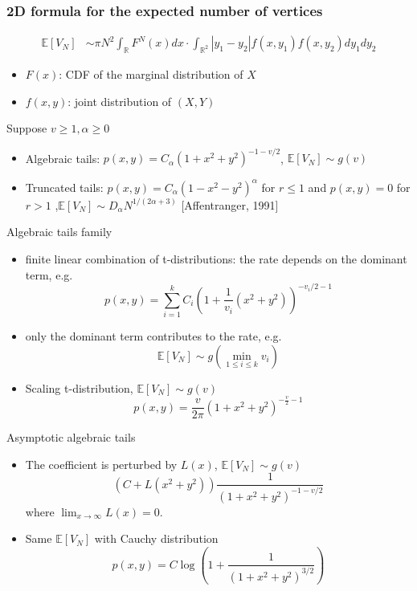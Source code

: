 \documentclass{beamer}
\def\E{\mathbb{E}}
\def\R{\mathbb{R}}
\begin{document}
\begin{frame}
    \frametitle{
        2D formula for the expected number of vertices
    }
    \begin{align*}
        \E[V_N]
        & \sim \pi N^2 \int_{\R} F^{N}(x) dx \cdot \int_{\R^2} |y_1-y_2| f(x, y_1) f(x,y_2)dy_1dy_2
    \end{align*}
    \begin{itemize}
        \item $F(x)$: CDF of the marginal distribution of $X$
        \item $f(x,y)$: joint distribution of $(X,Y)$
    \end{itemize}
    Suppose  $v\geq 1, \alpha \geq 0$
    \begin{itemize}
        \item Algebraic tails: $p(x,y) = C_{\alpha}(1+x^2+y^2)^{-1-v/2}$,
        $\E[V_N] \sim g(v)$
        \item Truncated tails: $p(x,y) = C_{\alpha}(1-x^2-y^2)^{\alpha}$ for $r\leq 1$ and $p(x,y)=0$ for $r>1$
        ,$\E[V_N] \sim D_{\alpha} N^{1/(2\alpha + 3)}$ [Affentranger, 1991]
    \end{itemize}

\end{frame}
\begin{frame}{Algebraic tails family}
    \begin{itemize}
        \item finite linear combination of t-distributions: the rate depends on the dominant term, e.g.
        \begin{equation*}
            p(x,y) = \sum_{i=1}^k C_i (1+\frac{1}{v_i}(x^2+y^2))^{-v_i/2 - 1}
        \end{equation*}
        \item only the dominant term contributes to the rate, e.g.
        \begin{equation*}
            \E[V_N] \sim g\left(
                \min_{1\leq i\leq k} v_i
                \right)
        \end{equation*}
        \item Scaling t-distribution, $\E[V_N] \sim g(v)$
        \begin{equation}
            p(x,y)= \frac{v}{2\pi}(1+x^2+y^2)^{-\frac{v}{2}-1}
        \end{equation}
    \end{itemize}
\end{frame}
\begin{frame}{Asymptotic algebraic tails}
    \begin{itemize}
        \item The coefficient is perturbed by $L(x)$, $\E[V_N] \sim g(v)$
        $$
        \left(C+L(x^2+y^2) \right)
        \frac{1}{(1+x^2+y^2)^{-1-v/2}}
        $$
        where $\lim_{x\to \infty} L(x) = 0$.
        \item  Same $\E[V_N]$ with Cauchy distribution
        \begin{equation*}
            p(x,y) = C \log \left(1+\frac{1}{(1+x^2+y^2)^{3/2}} \right)
        \end{equation*}
    \end{itemize}
\end{frame}
\end{document}
